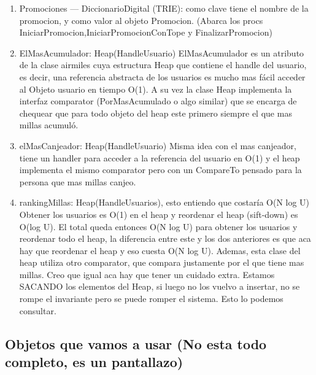 \documentclass[11pt,a4paper]{article}
\begin{document}
\begin{enumerate}
	\item Promociones --- DiccionarioDigital (TRIE): como clave tiene el nombre de la promocion, y como valor al objeto Promocion. (Abarca los procs IniciarPromocion,IniciarPromocionConTope y FinalizarPromocion)
	\item ElMasAcumulador: Heap(HandleUsuario) ElMasAcumulador es  un atributo de la clase airmiles cuya estructura Heap que contiene el handle del usuario, es decir, una referencia abstracta de los usuarios es mucho mas fácil acceder al Objeto usuario en tiempo O(1). A su vez la clase Heap implementa la interfaz comparator (PorMasAcumulado o algo similar) que se encarga de chequear que para todo objeto del heap este primero siempre el que mas millas acumuló.
	\item elMasCanjeador: Heap(HandleUsuario) Misma idea con el mas canjeador, tiene un handler para acceder a la referencia del usuario en O(1) y el heap implementa el mismo comparator pero con un CompareTo pensado para la persona que mas millas canjeo. 
	\item rankingMillas: Heap(HandleUsuarios), esto entiendo que costaría O(N log U) Obtener los usuarios es O(1) en el heap y reordenar el heap (sift-down) es O(log U). El total queda entonces O(N log U) para obtener los usuarios y reordenar todo el heap, la diferencia entre este y los dos anteriores es que aca hay que reordenar el heap y eso cuesta O(N log U). Ademas, esta clase del heap utiliza otro comparator, que compara justamente por el que tiene mas millas. Creo que igual aca hay que tener un cuidado extra. Estamos SACANDO los elementos del Heap, si luego no los vuelvo a insertar, no se rompe el invariante pero se puede romper el sistema. Esto lo podemos consultar.

\end{enumerate}


\subsection{Objetos que vamos a usar (No esta todo completo, es un pantallazo)}
\end{document}
